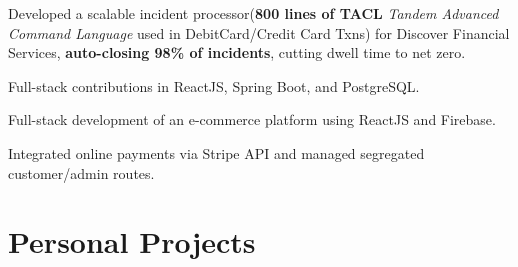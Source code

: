 \documentclass[]{divine-waters-resume}
\begin{document}
\begin{minipage}[t]{0.66\textwidth}
\begin{tightemize}
\item Developed a scalable incident processor(\textbf{800 lines of TACL} \textit{Tandem Advanced Command Language} used in DebitCard/Credit Card Txns) for  Discover Financial Services, \textbf{auto-closing 98\% of incidents}, cutting dwell time to net zero.
\item Full-stack contributions in ReactJS, Spring Boot, and PostgreSQL.
\end{tightemize}

\begin{tightemize}
\item Full-stack development of an e-commerce platform using ReactJS and Firebase.
\item Integrated online payments via Stripe API and managed segregated customer/admin routes.
\end{tightemize}


\section{Personal Projects}


\end{minipage}
\end{document}

